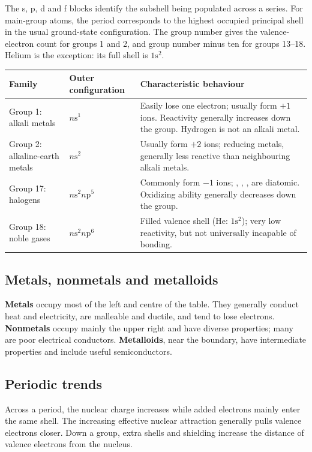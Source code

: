 \documentclass[a4paper,10pt]{article}
\begin{document}
The s, p, d and f blocks identify the subshell being populated across a series.
For main-group atoms, the period corresponds to the highest occupied principal
shell in the usual ground-state configuration. The group number gives the
valence-electron count for groups 1 and 2, and group number minus ten for groups
13--18. Helium is the exception: its full shell is $1\mathrm s^2$.

\begin{tabularx}{\linewidth}{@{}P{29mm}P{26mm}L@{}}
\toprule
Family & Outer configuration & Characteristic behaviour \\
\midrule
Group 1: alkali metals & $n\mathrm s^1$ & Easily lose one electron; usually form $+1$
ions. Reactivity generally increases down the group. Hydrogen is not an alkali metal. \\
Group 2: alkaline-earth metals & $n\mathrm s^2$ & Usually form $+2$ ions; reducing
metals, generally less reactive than neighbouring alkali metals. \\
Group 17: halogens & $n\mathrm s^2n\mathrm p^5$ & Commonly form $-1$ ions;
, , ,  are diatomic. Oxidizing ability generally
decreases down the group. \\
Group 18: noble gases & $n\mathrm s^2n\mathrm p^6$ & Filled valence shell (He:
$1\mathrm s^2$); very low reactivity, but not universally incapable of bonding. \\
\bottomrule
\end{tabularx}

\subsection{Metals, nonmetals and metalloids}
\textbf{Metals} occupy most of the left and centre of the table. They generally
conduct heat and electricity, are malleable and ductile, and tend to lose
electrons. \textbf{Nonmetals} occupy mainly the upper right and have diverse
properties; many are poor electrical conductors. \textbf{Metalloids}, near the
boundary, have intermediate properties and include useful semiconductors.

\subsection{Periodic trends}
Across a period, the nuclear charge increases while added electrons mainly
enter the same shell. The increasing effective nuclear attraction generally
pulls valence electrons closer. Down a group, extra shells and shielding
increase the distance of valence electrons from the nucleus.
\end{document}
